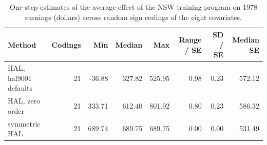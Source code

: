\begin{table}[!h]
\centering
\caption{\label{tab:recode_ate}One-step estimates of the average effect of the NSW training program on 1978 earnings (dollars) across random sign codings of the eight covariates.}
\centering
\begin{tabular}[t]{lrrrrrrr}
\toprule
Method & Codings & Min & Median & Max & Range / SE & SD / SE & Median SE\\
\midrule
HAL, hal9001 defaults & 21 & -36.88 & 327.82 & 525.95 & 0.98 & 0.23 & 572.12\\
HAL, zero order & 21 & 333.71 & 612.40 & 801.92 & 0.80 & 0.23 & 586.32\\
symmetric HAL & 21 & 689.74 & 689.75 & 689.75 & 0.00 & 0.00 & 531.49\\
\bottomrule
\end{tabular}
\end{table}
